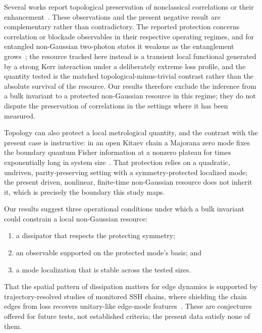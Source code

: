 \documentclass[aps,pra,preprint,superscriptaddress,amsmath,amssymb]{revtex4-2}
\begin{document}
Several works report topological preservation of nonclassical correlations or their enhancement~\cite{Wang2019Optica,Perez2024domainwalls,Li2024photonblockade}. These observations and the present negative result are complementary rather than contradictory. The reported protection concerns correlation or blockade observables in their respective operating regimes, and for entangled non-Gaussian two-photon states it weakens as the entanglement grows~\cite{Tschernig2021}; the resource tracked here instead is a transient local functional generated by a strong Kerr interaction under a deliberately extreme loss profile, and the quantity tested is the matched topological-minus-trivial contrast rather than the absolute survival of the resource. Our results therefore exclude the inference from a bulk invariant to a protected non-Gaussian resource in this regime; they do not dispute the preservation of correlations in the settings where it has been measured.

Topology can also protect a local metrological quantity, and the contrast with the present case is instructive: in an open Kitaev chain a Majorana zero mode fixes the boundary quantum Fisher information at a nonzero plateau for times exponentially long in system size~\cite{Plodzien2026}. That protection relies on a quadratic, undriven, parity-preserving setting with a symmetry-protected localized mode; the present driven, nonlinear, finite-time non-Gaussian resource does not inherit it, which is precisely the boundary this study maps.

Our results suggest three operational conditions under which a bulk invariant could constrain a local non-Gaussian resource:
\begin{enumerate}
  \item a dissipator that respects the protecting symmetry;
  \item an observable supported on the protected mode's basis; and
  \item a mode localization that is stable across the tested sizes.
\end{enumerate}
That the spatial pattern of dissipation matters for edge dynamics is supported by trajectory-resolved studies of monitored SSH chains, where shielding the chain edges from loss recovers unitary-like edge-mode features~\cite{Salatino2025}. These are conjectures offered for future tests, not established criteria; the present data satisfy none of them.
\end{document}
